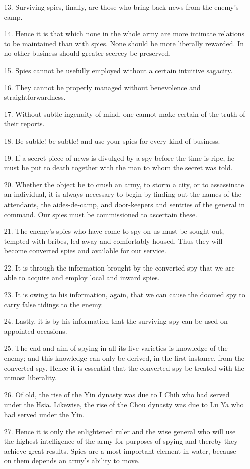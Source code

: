 \documentclass[11pt,openany]{memoir}
\newcommand{\enumeratemargin}{1.30em}
\begin{document}
\begin{enumerate}[leftmargin=\enumeratemargin]
\item[13.] Surviving spies, finally, are those who bring back news from the enemy's camp.
\item[14.] Hence it is that which none in the whole army are more intimate relations to be maintained than with spies. None should be more liberally rewarded. In no other business should greater secrecy be preserved.
\item[15.] Spies cannot be usefully employed without a certain intuitive sagacity.
\item[16.] They cannot be properly managed without benevolence and straightforwardness.
\item[17.] Without subtle ingenuity of mind, one cannot make certain of the truth of their reports.
\item[18.] Be subtle! be subtle! and use your spies for every kind of business.
\item[19.] If a secret piece of news is divulged by a spy before the time is ripe, he must be put to death together with the man to whom the secret was told.
\item[20.] Whether the object be to crush an army, to storm a city, or to assassinate an individual, it is always necessary to begin by finding out the names of the attendants, the aides-de-camp, and door-keepers and sentries of the general in command. Our spies must be commissioned to ascertain these.
\item[21.] The enemy's spies who have come to spy on us must be sought out, tempted with bribes, led away and comfortably housed. Thus they will become converted spies and available for our service.
\item[22.] It is through the information brought by the converted spy that we are able to acquire and employ local and inward spies.
\item[23.] It is owing to his information, again, that we can cause the doomed spy to carry false tidings to the enemy.
\item[24.] Lastly, it is by his information that the surviving spy can be used on appointed occasions.
\item[25.] The end and aim of spying in all its five varieties is knowledge of the enemy; and this knowledge can only be derived, in the first instance, from the converted spy. Hence it is essential that the converted spy be treated with the utmost liberality.
\item[26.] Of old, the rise of the Yin dynasty was due to I Chih who had served under the Hsia. Likewise, the rise of the Chou dynasty was due to Lu Ya who had served under the Yin.
\item[27.] Hence it is only the enlightened ruler and the wise general who will use the highest intelligence of the army for purposes of spying and thereby they achieve great results. Spies are a most important element in water, because on them depends an army's ability to move.
\end{enumerate}

\newpage\null\thispagestyle{empty}\newpage
\end{document}
